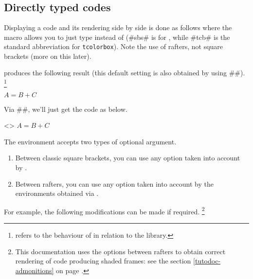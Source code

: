 

\subsection{Directly typed codes}

\begin{tdocexa}
    Displaying a code and its rendering side by side is done as follows where the macro  allows you to just type  instead of  (\tdoclatexin#sbs# is for , while \tdoclatexin#tcb# is the standard abbreviation for \texttt{tcolorbox}). Note the use of rafters, not square brackets (more on this later).

\end{tdocexa}


\begin{tdocexa}[Following]
     produces the following result (this default setting is also obtained by using \tdoclatexin##).%
    \footnote{
         refers to the  behaviour of  in relation to the  library.
    }

    \begin{tdoclatex}
$A = B + C$
    \end{tdoclatex}
\end{tdocexa}


\begin{tdocexa}
    Via \tdoclatexin##, we'll just get the code as below.

    \begin{tdoclatex}<>
$A = B + C$
    \end{tdoclatex}
\end{tdocexa}


\begin{tdocexa}[Customise]
	The  environment accepts two types of optional argument.
	\begin{enumerate}
		\item Between classic square brackets, you can use any option taken into account by .

		\item Between rafters, you can use any option taken into account by the environments obtained via .
	\end{enumerate}

	For example, the following modifications can be made if required.%
	\footnote{
		This documentation uses the options between rafters to obtain correct rendering of code producing shaded frames: see the section \ref{tutodoc-admonitions} on page \pageref{tutodoc-admonitions}.
	}

\end{tdocexa}

